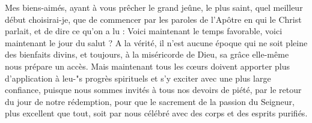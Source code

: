  Mes biens-aimés, ayant à vous prêcher le grand jeûne, le plus saint, quel meilleur début choisirai-je, que de commencer par les paroles de l’Apôtre en qui le Christ parlait, et de dire ce qu’on a lu : Voici maintenant le temps favorable, voici maintenant le jour du salut ? A la vérité, il n’est aucune époque qui ne soit pleine des bienfaits divins, et toujours, à la miséricorde de Dieu, sa grâce elle-même nous prépare un accès. Mais maintenant tous les cœurs doivent apporter plus d’application à leu-"s progrès spirituels et s’y exciter avec une plus large confiance, puisque nous sommes invités à tous nos devoirs de piété, par le retour du jour de notre rédemption, pour que le sacrement de la passion du Seigneur, plus excellent que tout, soit par nous célébré avec des corps et des esprits purifiés.